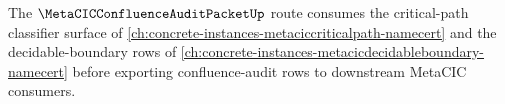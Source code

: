 The $\MetaCICConfluenceAuditPacketUp$ route consumes the critical-path classifier surface of \autoref{ch:concrete-instances-metaciccriticalpath-namecert} and the decidable-boundary rows of \autoref{ch:concrete-instances-metacicdecidableboundary-namecert} before exporting confluence-audit rows to downstream MetaCIC consumers.
